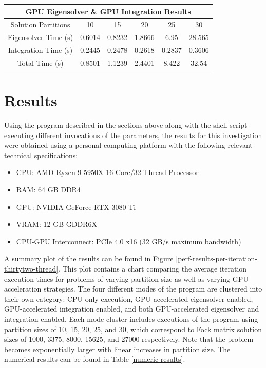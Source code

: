 \documentclass[conference, twoside]{IEEEtran}
\begin{document}
\begin{table}
\begin{tabular}{|c||c|c|c|c|c|}
        \hline
    \end{tabular}
    \begin{tabular}{|c||c|c|c|c|c|}
        \multicolumn{6}{c}{GPU Eigensolver \& GPU Integration Results} \\
        \hline
        {Solution Partitions} & {10} & {15} & {20} & {25} & {30} \\
        \hline
        \hline
        {Eigensolver Time (s)}              & {0.6014} & {0.8232} & {1.8666} & {6.95}   & {28.565}\\
        {Integration Time (s)}              & {0.2445} & {0.2478} & {0.2618} & {0.2837} & {0.3606}\\
        {Total Time (s)}                    & {0.8501} & {1.1239} & {2.4401} & {8.422}  & {32.54} \\
        \hline
    \end{tabular}
\end{table}

\section{Results} %

Using the program described in the sections above along with the shell script executing different invocations of the parameters, the results for this investigation were obtained using a personal computing platform with the following relevant technical specifications:

\begin{itemize}
    \item CPU: AMD Ryzen 9 5950X 16-Core/32-Thread Processor
    \item RAM: 64 GB DDR4
    \item GPU: NVIDIA GeForce RTX 3080 Ti
    \item VRAM: 12 GB GDDR6X 
    \item CPU-GPU Interconnect: PCIe 4.0 x16 (32 GB/s maximum bandwidth)
\end{itemize}

A summary plot of the results can be found in Figure \ref{perf-results-per-iteration-thirtytwo-thread}. This plot contains a chart comparing the average iteration execution times for problems of varying partition size as well as varying GPU acceleration strategies. The four different modes of the program are clustered into their own category: CPU-only execution, GPU-accelerated eigensolver enabled, GPU-accelerated integration enabled, and both GPU-accelerated eigensolver and integration enabled. Each mode cluster includes executions of the program using partition sizes of 10, 15, 20, 25, and 30, which correspond to Fock matrix solution sizes of 1000, 3375, 8000, 15625, and 27000 respectively. Note that the problem becomes exponentially larger with linear increases in partition size. The numerical results can be found in Table \ref{numeric-results}.
\end{document}
